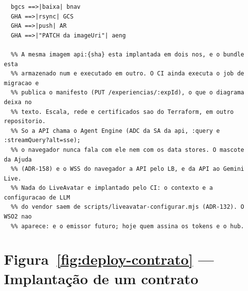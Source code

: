 \begin{lstlisting}[language=mermaid]
  %% o CI implanta cada artefato
  bgcs ==>|baixa| bnav
  GHA ==>|rsync| GCS
  GHA ==>|push| AR
  GHA ==>|"PATCH da imageUri"| aeng

  %% A mesma imagem api:{sha} esta implantada em dois nos, e o bundle esta
  %% armazenado num e executado em outro. O CI ainda executa o job de migracao e
  %% publica o manifesto (PUT /experiencias/:expId), o que o diagrama deixa no
  %% texto. Escala, rede e certificados sao do Terraform, em outro repositorio.
  %% So a API chama o Agent Engine (ADC da SA da api, :query e :streamQuery?alt=sse);
  %% o navegador nunca fala com ele nem com os data stores. O mascote da Ajuda
  %% (ADR-158) e o WSS do navegador a API pelo LB, e da API ao Gemini Live.
  %% Nada do LiveAvatar e implantado pelo CI: o contexto e a configuracao de LLM
  %% do vendor saem de scripts/liveavatar-configurar.mjs (ADR-132). O WSO2 nao
  %% aparece: e o emissor futuro; hoje quem assina os tokens e o hub.
\end{lstlisting}

\section{Figura~\ref{fig:deploy-contrato} --- Implantação de um contrato}

